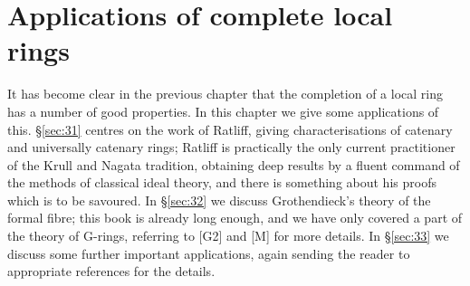 \chapter{Applications of complete local rings}\label{ch:11}

It has become clear in the previous chapter that the completion of a local
ring has a number of good properties. In this chapter we give some
applications of this. \S\ref{sec:31} centres on the work of Ratliff, giving
characterisations of catenary and universally catenary rings; Ratliff is
practically the only current practitioner of the Krull and Nagata tradition,
obtaining deep results by a fluent command of the methods of classical
ideal theory, and there is something about his proofs which is to be
savoured. In \S\ref{sec:32} we discuss Grothendieck's theory of the formal fibre;
this book is already long enough, and we have only covered a part of the
theory of G-rings, referring to [G2] and [M] for more details. In \S\ref{sec:33} we
discuss some further important applications, again sending the reader to
appropriate references for the details.





